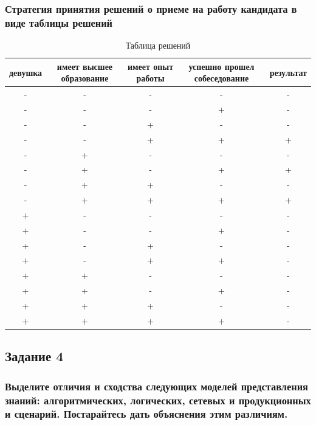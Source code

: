 \documentclass[14pt,a4paper,report]{report}
\begin{document}
\clearpage

\subsubsection{Стратегия принятия решений о приеме на работу кандидата в виде таблицы решений}

\begin{table}[h!]
\centering
\bgroup
\def\arraystretch{1}
\begin{tabular}{ | c| c | c |c |c | }
\hline
девушка & имеет высшее образование & имеет опыт работы & успешно прошел собеседование & результат 
\\ \hline

- & - & - & - & - \\ \hline 
- & - & - & + & - \\ \hline
- & - & + & - & - \\ \hline 
- & - & + & + & + \\ \hline

- & + & - & - & - \\ \hline 
- & + & - & + & + \\ \hline
- & + & + & - & - \\ \hline 
- & + & + & + & + \\ \hline

+ & - & - & - & - \\ \hline
+ & - & - & + & - \\ \hline
+ & - & + & - & - \\ \hline
+ & - & + & + & - \\ \hline

+ & + & - & - & - \\ \hline
+ & + & - & + & - \\ \hline
+ & + & + & - & - \\ \hline
+ & + & + & + & - \\ \hline
\end{tabular}
\egroup
\caption{Таблица решений}
\label{table:1}
\end{table}

\subsection{Задание 4}

\subsubsection{Выделите отличия и сходства следующих моделей представления знаний: алгоритмических, логических, сетевых и продукционных и сценарий. Постарайтесь дать объяснения этим различиям.}
\end{document}
